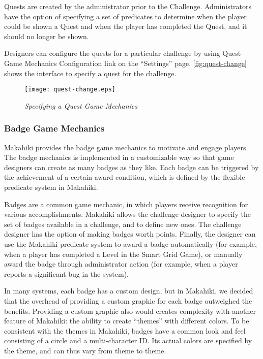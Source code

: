 Quests are created by the administrator prior to the Challenge. Administrators have the option of specifying a set of predicates to determine when the player could be shown a Quest and when the player has completed the Quest, and it should no longer be shown.

Designers can configure the quests for a particular challenge by using Quest Game Mechanics Configuration link on the ``Settings'' page. \autoref{fig:quest-change} shows the interface to specify a quest for the challenge.

\begin{figure}[!ht]
  \center
  \texttt{[image: quest-change.eps]}
  \caption{\em Specifying a Quest Game Mechanics}
  \label{fig:quest-change}
\end{figure}

\clearpage

\subsubsection{Badge Game Mechanics}

Makahiki provides the badge game mechanics to motivate and engage players. The badge mechanics is implemented in a customizable way so that  game designers can create as many badges as they like. Each badge can be triggered by the achievement of a certain award condition, which is defined by the flexible predicate system in Makahiki. 

Badges are a common game mechanic, in which players receive recognition for various accomplishments. Makahiki allows the challenge designer to specify the set of badges available in a challenge, and to define new ones. The challenge designer has the option of making badges worth points. Finally, the designer can use the Makahiki predicate system to award a badge automatically (for example, when a player has completed a Level in the Smart Grid Game), or manually award the badge through administrator action (for example, when a player reports a significant bug in the system).

In many systems, each badge has a custom design, but in Makahiki, we decided that the overhead of providing a custom graphic for each badge outweighed the benefits. Providing a custom graphic also would creates complexity with another feature of Makahiki: the ability to create ``themes'' with different colors. To be consistent with the themes in Makahiki, badges have a common look and feel consisting of a circle and a multi-character ID. Its actual colors are specified by the theme, and can thus vary from theme to theme.

